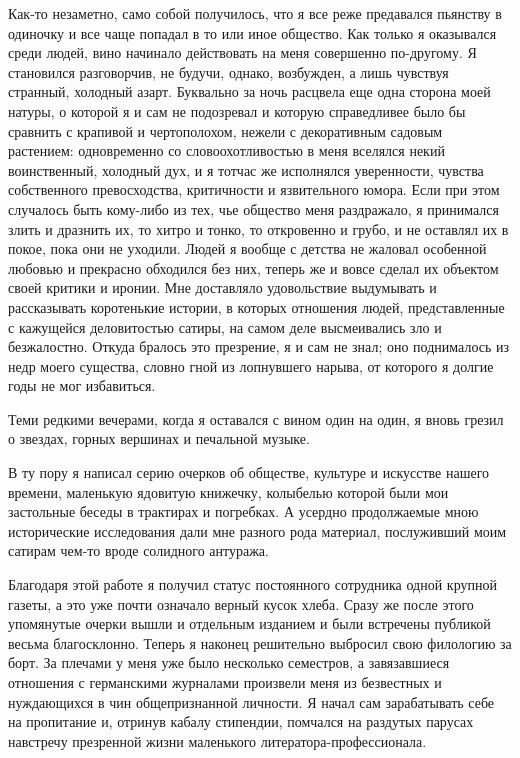 Как-то незаметно,  само собой  получилось, что  я все  реже предавался
пьянству в  одиночку и все  чаще попадал в  то или иное  общество. Как
только я  оказывался среди  людей, вино  начинало действовать  на меня
совершенно по-другому.  Я становился  разговорчив, не  будучи, однако,
возбужден, а лишь чувствуя странный, холодный азарт. Буквально за ночь
расцвела  еще  одна  сторона  моей  натуры,  о  которой  я  и  сам  не
подозревал  и  которую справедливее  было  бы  сравнить с  крапивой  и
чертополохом,  нежели с  декоративным садовым  растением: одновременно
со  словоохотливостью в  меня  вселялся  некий воинственный,  холодный
дух,  и  я  тотчас  же исполнялся  уверенности,  чувства  собственного
превосходства,  критичности  и  язвительного   юмора.  Если  при  этом
случалось  быть кому-либо  из  тех, чье  общество  меня раздражало,  я
принимался злить  и дразнить  их, то  хитро и  тонко, то  откровенно и
грубо, и не оставлял их в покое, пока они не уходили. Людей я вообще с
детства не  жаловал особенной любовью  и прекрасно обходился  без них,
теперь  же и  вовсе сделал  их объектом  своей критики  и иронии.  Мне
доставляло удовольствие выдумывать и рассказывать коротенькие истории,
в  которых отношения  людей, представленные  с кажущейся  деловитостью
сатиры, на самом  деле высмеивались зло и  безжалостно. Откуда бралось
это  презрение,  я и  сам  не  знал;  оно  поднималось из  недр  моего
существа, словно гной из лопнувшего  нарыва, от которого я долгие годы
не мог избавиться.

Теми редкими вечерами, когда я оставался с вином один на один, я вновь
грезил о звездах, горных вершинах и печальной музыке.

В ту  пору я написал серию  очерков об обществе, культуре  и искусстве
нашего времени,  маленькую ядовитую  книжечку, колыбелью  которой были
мои застольные беседы в трактирах  и погребках. А усердно продолжаемые
мною  исторические  исследования  дали   мне  разного  рода  материал,
послуживший моим сатирам чем-то вроде солидного антуража.

Благодаря этой  работе я  получил статус постоянного  сотрудника одной
крупной газеты, а это уже почти  означало верный кусок хлеба. Сразу же
после  этого  упомянутые очерки  вышли  и  отдельным изданием  и  были
встречены публикой  весьма благосклонно.  Теперь я  наконец решительно
выбросил свою филологию за борт. За  плечами у меня уже было несколько
семестров, а завязавшиеся отношения  с германскими журналами произвели
меня  из безвестных  и нуждающихся  в чин  общепризнанной личности.  Я
начал сам зарабатывать себе на пропитание и, отринув кабалу стипендии,
помчался  на раздутых  парусах навстречу  презренной жизни  маленького
литератора-профессионала.


